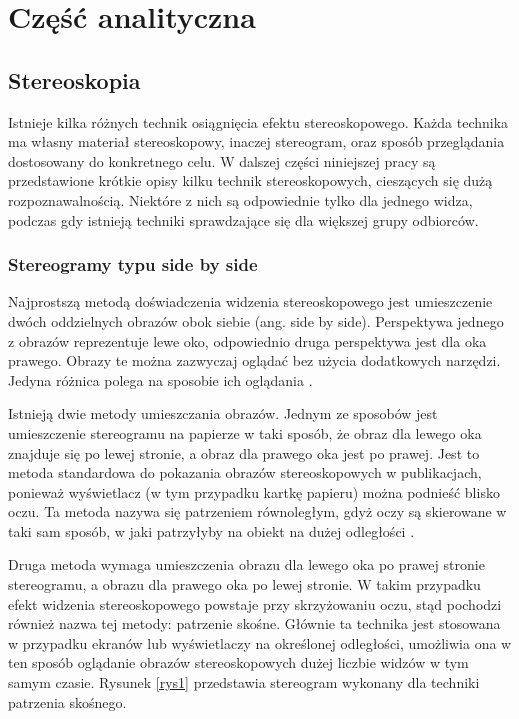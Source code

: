 \newpage
\section[Część analityczna]{Część analityczna}
\subsection{Stereoskopia}
Istnieje kilka różnych technik osiągnięcia efektu stereoskopowego. Każda technika ma własny materiał stereoskopowy, inaczej stereogram, oraz sposób przeglądania dostosowany do konkretnego celu. W dalszej części niniejszej pracy są przedstawione krótkie opisy kilku technik stereoskopowych, cieszących się dużą rozpoznawalnością. Niektóre z nich są odpowiednie tylko dla jednego widza, podczas gdy istnieją techniki sprawdzające się dla większej grupy odbiorców.

\subsubsection{Stereogramy typu side by side}
Najprostszą metodą doświadczenia widzenia stereoskopowego jest umieszczenie dwóch oddzielnych obrazów obok siebie (ang. side by side). Perspektywa jednego z obrazów reprezentuje lewe oko, odpowiednio druga perspektywa jest dla oka prawego. Obrazy te można zazwyczaj oglądać bez użycia dodatkowych narzędzi. Jedyna różnica polega na sposobie ich oglądania \cite{stereoscopythesis}. 

Istnieją dwie metody umieszczania obrazów. Jednym ze sposobów jest umieszczenie stereogramu na papierze w taki sposób, że obraz dla lewego oka znajduje się po lewej stronie, a obraz dla prawego oka jest po prawej. Jest to metoda standardowa do pokazania obrazów stereoskopowych w publikacjach, ponieważ wyświetlacz (w tym przypadku kartkę papieru) można podnieść blisko oczu. Ta metoda nazywa się patrzeniem równoległym, gdyż oczy są skierowane w taki sam sposób, w jaki patrzyłyby na obiekt na dużej odległości \cite{sidebysideinfo}.

Druga metoda wymaga umieszczenia obrazu dla lewego oka po prawej stronie stereogramu, a obrazu dla prawego oka po lewej stronie. W takim przypadku efekt widzenia stereoskopowego powstaje przy skrzyżowaniu oczu, stąd pochodzi również nazwa tej metody: patrzenie skośne. Głównie ta technika jest stosowana w przypadku ekranów lub wyświetlaczy na określonej odległości, umożliwia ona w ten sposób oglądanie obrazów stereoskopowych dużej liczbie widzów w tym samym czasie\cite{sidebysideinfo}. Rysunek \ref{rys1} przedstawia stereogram wykonany dla techniki patrzenia skośnego.

